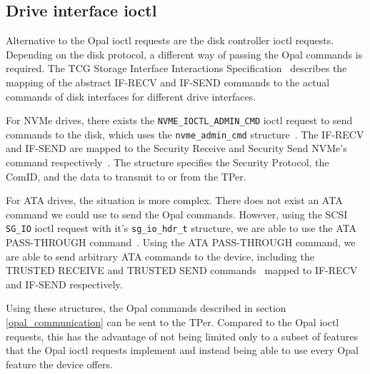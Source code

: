 \subsection{Drive interface ioctl}
\label{direct_communication_raw_ioctl}

Alternative to the Opal ioctl requests are the disk controller ioctl requests. Depending on the disk protocol, a different way of passing the Opal commands is required.
The TCG Storage Interface Interactions Specification~\cite{tcg-siis} describes the mapping of the abstract IF-RECV and IF-SEND commands to the actual commands of disk interfaces for different drive interfaces.

For NVMe drives, there exists the \verb|NVME_IOCTL_ADMIN_CMD| ioctl request to send commands to the disk, which uses the \verb|nvme_admin_cmd| structure~\cite{nvme-express-base-specification}. The IF-RECV and IF-SEND are mapped to the Security Receive and Security Send NVMe's command respectively~\cite{tcg-siis}. The structure specifies the Security Protocol, the ComID, and the data to transmit to or from the TPer.

For ATA drives, the situation is more complex. There does not exist an ATA command we could use to send the Opal commands.
However, using the SCSI \verb|SG_IO| ioctl request with it's \verb|sg_io_hdr_t| structure, we are able to use the ATA PASS-THROUGH command~\cite{ata_passthrough}. Using the ATA PASS-THROUGH command, we are able to send arbitrary ATA commands to the device, including the TRUSTED RECEIVE and TRUSTED SEND commands~\cite{acs-3} mapped to IF-RECV and IF-SEND respectively.





Using these structures, the Opal commands described in section \ref{opal_communication} can be sent to the TPer. Compared to the Opal ioctl requests, this has the advantage of not being limited only to a subset of features that the Opal ioctl requests implement and instead being able to use every Opal feature the device offers. %

